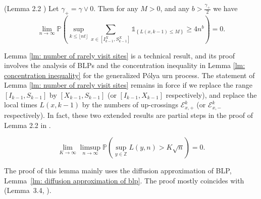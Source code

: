 \documentclass[EJP]{ejpecp} %
\begin{document}
\begin{lemma}(Lemma 2.2 \cite{KMP23})\label{lm: number of rarely visit sites}
	Let $\gamma_+ = \gamma \vee 0$. Then for any $M>0$, and any $b>\frac{\gamma_+}{2}$ we have
	$$
	\lim_{n\to\infty} \mathbb{P}\left(\sup_{k\leq\lfloor nt \rfloor}  \sum_{x\in [I^X_{k-1}, S^X_{k-1}]} \mathbb{1}_{\left\{ L(x,k-1) \leq M \right\}} \geq 4n^b \right) = 0.
	$$
	
\end{lemma}	
Lemma \ref{lm: number of rarely visit sites} is a technical result, and its proof involves the analysis of BLPs and the concentration inequality in Lemma \ref{lm: concentration inequality} for the generalized P\'{o}lya urn process. The statement of Lemma \ref{lm: number of rarely visit sites} remains in force if we replace the range $[I_{k-1}, S_{k-1}]$ by $[X_{k - 1},S_{k - 1}]$ (or $[I_{k-1},X_{k - 1}]$ respectively), and replace the local times $L(x,k-1)$ by the numbers of up-crossings $\mathcal{E}^{k}_{x,+}$ (or $\mathcal{E}^{k}_{x,-}$ respectively). In fact, these two extended results are partial steps in the proof of Lemma 2.2 in \cite{KMP23}.   

\begin{lemma}
	\label{lm: uniform control of local time}
	\[
	\lim_{K \to  \infty } \limsup_{n \to \infty } \mathbb{P}\left( \sup_{y \in \mathbb{Z}} L\left( y, n \right) > K \sqrt{n}  \right) = 0
	.\] 
\end{lemma}
The proof of this lemma mainly uses the diffusion approximation of BLP, Lemma~\ref{lm: diffusion approximation of blp}. The proof mostly coincides with (Lemma~3.4, \cite{KP16}). 
\end{document}
